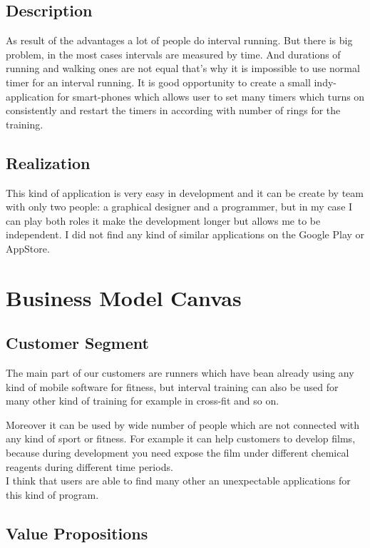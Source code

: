 \documentclass[english]{article}
\begin{document}
\subsection{Description}
As result of the advantages a lot of people do interval running. But there is big problem,
in the most cases intervals are measured by time. And durations of running and
walking ones are not equal that’s why it is impossible to use normal timer for an interval
running. It is good opportunity to create a small indy-application for smart-phones
which allows user to set many timers which turns on consistently and restart the timers
in according with number of rings for the training.
\subsection{Realization}
This kind of application is very easy in development and it can be create by team with
only two people: a graphical designer and a programmer, but in my case I can play both
roles it make the development longer but allows me to be independent. I did not find any
kind of similar applications on the Google Play or AppStore.


\section{Business Model Canvas}

\subsection{Customer Segment}


The main part of our customers are runners which have bean already using any kind of mobile software for fitness, but interval training can also be used for many other kind of training for example in cross-fit and so on. 

Moreover it can be used by wide number of people which are not connected with any kind of sport or fitness. For example it can help customers to develop films, because during development you need expose the film under different chemical reagents during different time periods.\\
 
I think that users are able to find many other an unexpectable applications for this kind of program.

\subsection{Value Propositions}
\end{document}
